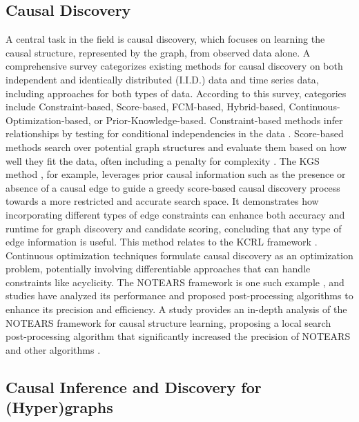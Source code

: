 {\newpage

\subsection{Causal Discovery}

A central task in the field is causal discovery, which focuses on learning the causal structure, represented by the graph, from observed data alone. A comprehensive survey categorizes existing methods for causal discovery on both independent and identically distributed (I.I.D.) data and time series data, including approaches for both types of data. According to this survey, categories include Constraint-based, Score-based, FCM-based, Hybrid-based, Continuous-Optimization-based, or Prior-Knowledge-based. Constraint-based methods infer relationships by testing for conditional independencies in the data \cite{Glymour2019Review, Spirtes2000Causation, Eberhardt2017Introduction}. Score-based methods search over potential graph structures and evaluate them based on how well they fit the data, often including a penalty for complexity \cite{Chickering2002Optimal}. The KGS method \cite{hasan2022kcrl}, for example, leverages prior causal information such as the presence or absence of a causal edge to guide a greedy score-based causal discovery process towards a more restricted and accurate search space. It demonstrates how incorporating different types of edge constraints can enhance both accuracy and runtime for graph discovery and candidate scoring, concluding that any type of edge information is useful. This method relates to the KCRL framework \cite{hasan2022kcrl}. Continuous optimization techniques formulate causal discovery as an optimization problem, potentially involving differentiable approaches that can handle constraints like acyclicity. The NOTEARS framework is one such example \cite{Zheng2018Dags}, and studies have analyzed its performance and proposed post-processing algorithms to enhance its precision and efficiency. A study provides an in-depth analysis of the NOTEARS framework for causal structure learning, proposing a local search post-processing algorithm that significantly increased the precision of NOTEARS and other algorithms \cite{hasan2024surveycausaldiscoverymethods}.


\subsection{Causal Inference and Discovery for (Hyper)graphs}
\label{subsec:causal_graphs_hypergraphs}

}
